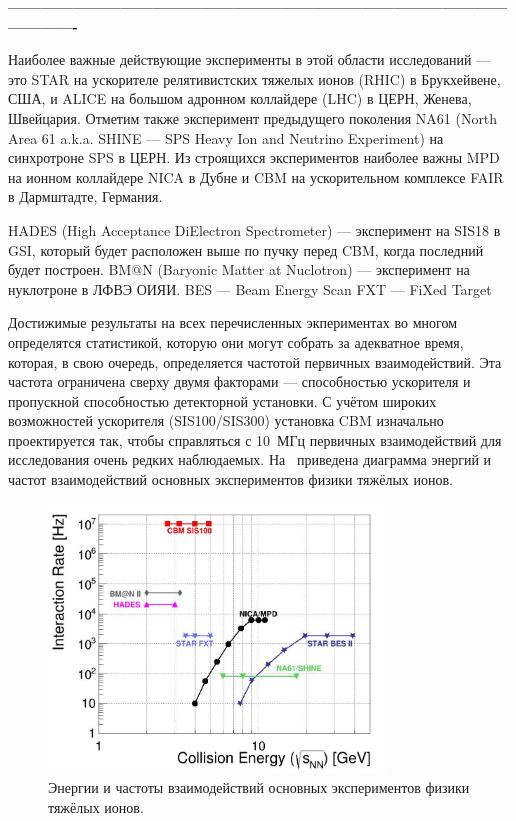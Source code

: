 \textbf{----------------------------------------------------------------------------------------------------------}



Наиболее важные действующие эксперименты в этой области исследований --- это STAR на ускорителе релятивистских тяжелых ионов (RHIC) в Брукхейвене, США, и ALICE на большом адронном коллайдере (LHC) в ЦЕРН, Женева, Швейцария. Отметим также эксперимент предыдущего поколения NA61 (North Area 61 a.k.a. SHINE --- SPS Heavy Ion and Neutrino Experiment) на синхротроне SPS в ЦЕРН. Из строящихся экспериментов наиболее важны MPD на ионном коллайдере NICA в Дубне и CBM на ускорительном комплексе FAIR в Дармштадте, Германия.

HADES (High Acceptance DiElectron Spectrometer) --- эксперимент на SIS18 в GSI, который будет расположен выше по пучку перед CBM, когда последний будет построен.
BM$@$N (Baryonic Matter at Nuclotron) --- эксперимент на нуклотроне в ЛФВЭ ОИЯИ.
BES --- Beam Energy Scan
FXT --- FiXed Target

Достижимые результаты на всех перечисленных экпериментах во многом определятся статистикой, которую они могут собрать за адекватное время, которая, в свою очередь, определяется частотой первичных взаимодействий. 
Эта частота ограничена сверху двумя факторами --- способностью ускорителя и пропускной способностью детекторной установки.
С учётом широких возможностей ускорителя (SIS100/SIS300) установка CBM изначально проектируется так, чтобы справляться с 10~МГц первичных взаимодействий для исследования очень редких наблюдаемых.
На~ приведена диаграмма энергий и частот взаимодействий основных экспериментов физики тяжёлых ионов.

\begin{figure}[H]
\includegraphics[width=0.8\textwidth]{pictures/Experiments.png}
\caption{Энергии и частоты взаимодействий основных экспериментов физики тяжёлых ионов.}
\label{fig:Experiments}
\end{figure}

